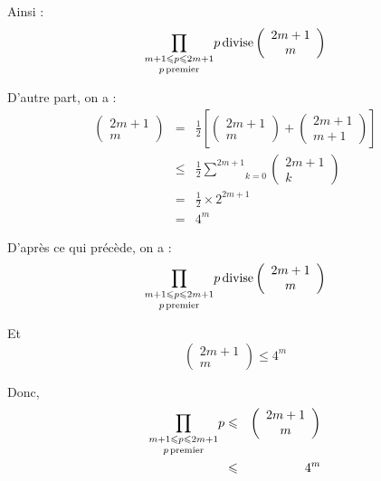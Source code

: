 Ainsi :
\[ \underset{p \operatorname{premier}}{\underset{m + 1 \leqslant p \leqslant 2 m +
   1}{\prod}} p \operatorname{divise} \left( \begin{array}{c}
     2 m + 1\\
     m
   \end{array} \right) \]


D'autre part, on a :
\begin{eqnarray*}
  \left( \begin{array}{c}
    2 m + 1\\
    m
  \end{array} \right) & = & \frac{1}{2} \left[ \left( \begin{array}{c}
    2 m + 1\\
    m
  \end{array} \right) + \left( \begin{array}{c}
    2 m + 1\\
    m + 1
  \end{array} \right) \right]\\
  & \leqslant & \frac{1}{2} \underset{k = 0}{\overset{2 m + 1}{\sum}} \left(
  \begin{array}{c}
    2 m + 1\\
    k
  \end{array} \right)\\
  & = & \frac{1}{2} \times 2^{2 m + 1}\\
  & = & 4^m
\end{eqnarray*}


 D'apr{\`e}s ce qui pr{\'e}c{\`e}de, on a :
\[ \underset{p \operatorname{premier}}{\underset{m + 1 \leqslant p \leqslant 2 m +
   1}{\prod}} p \operatorname{divise} \left( \begin{array}{c}
     2 m + 1\\
     m
   \end{array} \right) \]


Et
\[ \left( \begin{array}{c}
     2 m + 1\\
     m
   \end{array} \right) \leqslant 4^m \]


Donc,
\begin{eqnarray*}
  \underset{p \operatorname{premier}}{\underset{m + 1 \leqslant p \leqslant 2 m +
  1}{\prod}} p & \leqslant & \left( \begin{array}{c}
    2 m + 1\\
    m
  \end{array} \right)\\
  & \leqslant & 4^m
\end{eqnarray*}


